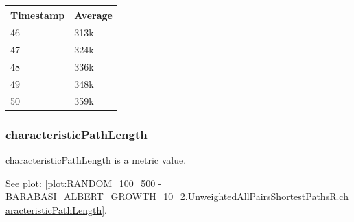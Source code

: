 \begin{tabular}{|l||l|}
\hline
	\textbf{Timestamp} & \textbf{Average} \\ \hline
	46 & 313k \\ \hline
	47 & 324k \\ \hline
	48 & 336k \\ \hline
	49 & 348k \\ \hline
	50 & 359k \\ \hline
\end{tabular}

\subsubsection{characteristicPathLength}
characteristicPathLength is a metric value.

See plot: \ref{plot:RANDOM_100_500 - BARABASI_ALBERT_GROWTH_10_2.UnweightedAllPairsShortestPathsR.characteristicPathLength}.

